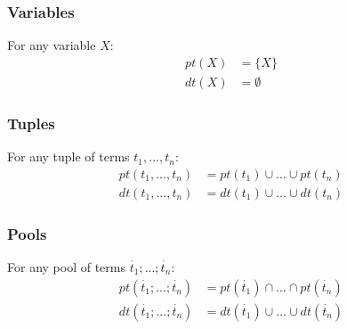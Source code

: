 \documentclass{article}
\newcommand{\tuple}[1]{\dot{#1}}
\newcommand{\set}[1]{\{#1\}}
\begin{document}
	\subsubsection{Variables}
	For any variable $X$:
	\begin{align}
		pt(X) &= \set{X} \\
		dt(X) &= \emptyset
	\end{align}

	\subsubsection{Tuples}
	For any tuple of terms $t_1,...,t_n$:
	\begin{align}
		pt(t_1,...,t_n) &= pt(t_1) \cup \dots \cup pt(t_n) \\
		dt(t_1,...,t_n) &= dt(t_1) \cup \dots \cup dt(t_n)
	\end{align}

	\subsubsection{Pools}
	For any pool of terms $\tuple{t_1};...;\tuple{t_n}$:
	\begin{align}
		pt(\tuple{t_1};...;\tuple{t_n}) &= pt(\tuple{t_1}) \cap \dots \cap pt(\tuple{t_n}) \\
		dt(\tuple{t_1};...;\tuple{t_n}) &= dt(\tuple{t_1}) \cup \dots \cup dt(\tuple{t_n})
	\end{align}

\end{document}
